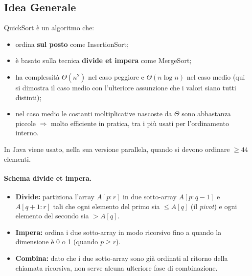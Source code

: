 \subsection{Idea Generale}

QuickSort è un algoritmo che:
\begin{itemize}
	\item ordina \textbf{sul posto} come InsertionSort;
	\item è basato sulla tecnica \textbf{divide et impera} come MergeSort;
	\item ha complessità $\Theta(n^2)$ nel caso peggiore e $\Theta(n \log n)$
	nel caso medio (qui si dimostra il caso medio con l'ulteriore
	assunzione che i valori siano tutti distinti);
	\item nel caso medio le costanti moltiplicative nascoste da $\Theta$ sono
	abbastanza piccole $\Rightarrow$ molto efficiente in pratica, tra
	i più usati per l'ordinamento interno.
\end{itemize}

\begin{nota}
	In Java viene usato, nella sua versione parallela, quando si devono
	ordinare $\ge 44$ elementi.
\end{nota}

\paragraph{Schema divide et impera.}
\begin{itemize}
	\item \textbf{Divide:} partiziona l'array $A[p:r]$ in due
	sotto-array $A[p:q-1]$ e $A[q+1:r]$ tali che ogni elemento
	del primo sia $\le A[q]$ (il \emph{pivot}) e ogni elemento
	del secondo sia $> A[q]$.
	\item \textbf{Impera:} ordina i due sotto-array in modo ricorsivo
	fino a quando la dimensione è 0 o 1 (quando $p \ge r$).
	\item \textbf{Combina:} dato che i due sotto-array sono già ordinati
	al ritorno della chiamata ricorsiva, non serve alcuna ulteriore
	fase di combinazione.
\end{itemize}

\begin{algorithm}[H]
	\caption{QuickSort$(A, p, r)$}
\end{algorithm}

